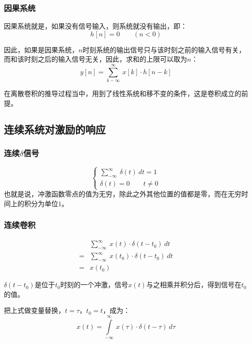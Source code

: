 \subsubsection{因果系统}
因果系统就是，如果没有信号输入，则系统就没有输出，即：
\begin{equation}
	h[n]=0\qquad (n< 0)
\end{equation}

因此，如果是因果系统，$n$时刻系统的输出信号只与该时刻之前的输入信号有关，而和该时刻之后的输入信号无关，因此，求和的上限可以取为$n$：
\begin{equation}
	y[n]=\sum\limits_{k-\infty}^\infty\ x[k]\cdot h[n-k]
\end{equation}

在离散卷积的推导过程当中，用到了线性系统和移不变的条件，这是卷积成立的前提。

\subsection{连续系统对激励的响应}
\subsubsection{连续$\delta$信号}
\begin{equation}
	\left\{
	\begin{aligned}
		\sum_{-\infty}^{\infty}\ \delta(t)\ dt=1 \\
		\delta(t)=0\qquad t\neq 0
	\end{aligned}
	\right.
\end{equation}
也就是说，冲激函数零点的值为无穷，除此之外其他位置的值都是零，而在无穷时间上的积分为单位$1$。
\subsubsection{连续卷积}
\begin{align*}
	  & \sum\limits_{-\infty}^{\infty}\ x(t)\cdot \delta(t-t_0)\ dt   \\
	= & \sum\limits_{-\infty}^{\infty}\ x(t_0)\cdot \delta(t-t_0)\ dt \\
	= & x(t_0)
\end{align*}

$\delta(t-t_0)$是位于$t_0$时刻的一个冲激，信号$x(t)$与之相乘并积分后，得到信号在$t_0$的值。

把上式做变量替换，$t=\tau$，$t_0=t$，成为：
\begin{equation}
	x(t)=\int\limits_{-\infty}^\infty\ x(\tau)\cdot \delta(t-\tau)\ d\tau
\end{equation}

